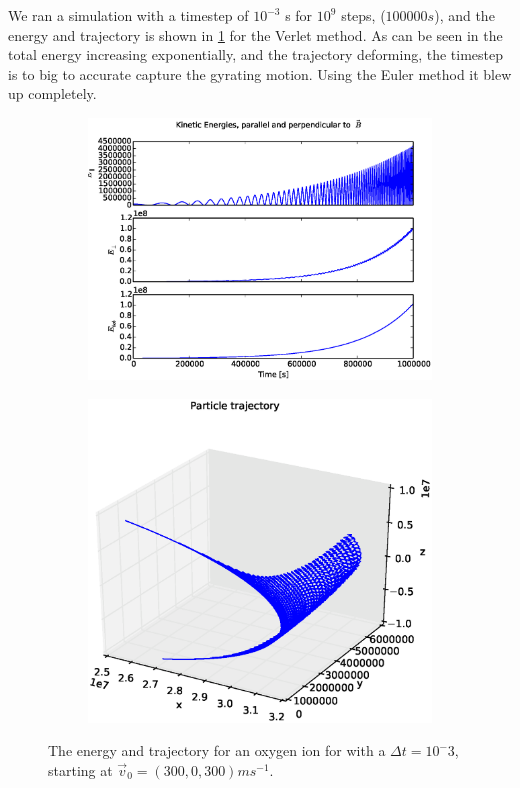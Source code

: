 \documentclass[x11names]{article}
\renewcommand{\va}{\vec}
\begin{document}
    We ran a simulation with a timestep of \(10^{-3}\) s for \(10^9\) steps, (\(100000 s\)), and the energy and trajectory is shown in \cref{fig:v_0_prop} for the Verlet method. As can be seen in the total energy increasing exponentially, and the trajectory deforming, the timestep is to big to accurate capture the gyrating motion. Using the Euler method it blew up completely.
    \begin{figure}[ht]
      \begin{subfigure}{0.45\textwidth}
        \includegraphics[width = \textwidth]{figures/ion_9_3_Verletenergy}
      \end{subfigure}
      \begin{subfigure}{0.45\textwidth}
        \includegraphics[width = \textwidth]{figures/ion_9_3_Verlet3Dplot}
      \end{subfigure}
      \caption{The energy and trajectory for an oxygen ion for with a \(\Delta t = 10^-3\), starting at \(\va{v}_0 = (300, 0, 300) \si{ms^{-1} }\).}
      \label{fig:v_0_prop}
    \end{figure}
\end{document}
